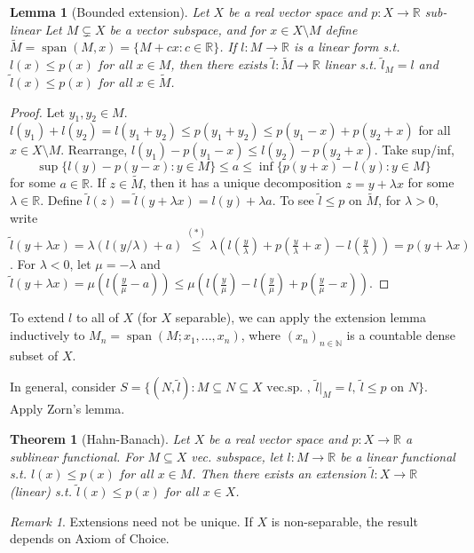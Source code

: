 \documentclass{article}
\theoremstyle{definition}
\theoremstyle{remark}
\newtheorem{rem}{Remark}
\theoremstyle{plain}
\newtheorem{lem}[defn]{Lemma}
\newtheorem{thm}[defn]{Theorem}
\newcommand{\NN}{\mathbb{N}}
\newcommand{\RR}{\mathbb{R}}
\begin{document}
\begin{lem}[Bounded extension]
    Let $X$ be a real vector space and $p:X\to\RR$ sub-linear Let $M\subsetneq X$ be a vector subspace, and for $x\in X\setminus M$ define $\tilde{M}=\operatorname{span}(M,x)=\{M+cx:c\in\RR\}$. If $l:M\to \RR$ is a linear form s.t. $l(x)\le p(x)$ for all $x\in M$, then there exists $\tilde l:\tilde M\to\RR$ linear s.t. $\tilde l_{M}=l$ and $\tilde l(x)\le p(x)$ for all $x\in\tilde M$.
\end{lem}
\begin{proof}
    Let $y_1,y_2\in M$. $l(y_1)+l(y_2)=l(y_1+y_2)\leq p(y_1+y_2)\le p(y_1-x)+p(y_2+x)$ for all $x\in X\setminus M$. Rearrange, $l(y_1)-p(y_1-x)\le l(y_2)-p(y_2+x)$. Take sup/inf, 
    \[\sup\{l(y)-p(y-x):y\in M\}\le a\le \inf\{p(y+x)-l(y):y\in M\}\tag{$\ast$}\] for some $a\in\RR$.
    If $z\in\tilde M$, then it has a unique decomposition $z=y+\lambda x$ for some $\lambda\in\RR$. Define $\tilde l(z)=\tilde l(y+\lambda x)=l(y)+\lambda a$. To see $\tilde l\le p$ on $\tilde M$, for $\lambda>0$, write $\tilde l (y+\lambda x)=\lambda (l(y/\lambda)+a)\overset{(\ast)}{\le}\lambda(l(\frac y\lambda)+p(\frac{y}{\lambda}+x)-l(\frac y\lambda))=p(y+\lambda x)$. For $\lambda<0$, let $\mu=-\lambda$ and $\tilde l(y+\lambda x)=\mu(l(\frac y\mu-a))\le \mu(l(\frac y\mu)-l(\frac y\mu)+p(\frac y\mu-x))$.
\end{proof}
To extend $l$ to all of $X$ (for $X$ separable), we can apply the extension lemma inductively to $M_n=\operatorname{span}(M;x_1,...,x_n)$, where $(x_n)_{n\in\NN}$ is a countable dense subset of $X$.

In general, consider $S=\{(N,\tilde l):M\subseteq N\subseteq X\text{ vec.sp. },\  \tilde l|_M=l,\ \tilde l\le p\text{ on }N\}$. Apply Zorn's lemma.

\begin{thm}[Hahn-Banach]
    Let $X$ be a real vector space and $p:X\to\RR$ a sublinear functional. For $M\subseteq X$ vec. subspace, let $l:M\to\RR$ be a linear functional s.t. $l(x)\le p(x)$ for all $x\in M$. Then there exists an extension $\tilde l:X\to\RR$ (linear) s.t. $\tilde l(x)\le p(x)$ for all $x\in X$.
\end{thm}
\begin{rem}
    Extensions need not be unique. If $X$ is non-separable, the result depends on Axiom of Choice.
\end{rem}
\end{document}

